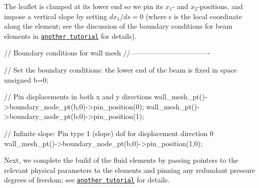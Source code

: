 The leaflet is clamped at its lower end so we pin its $x_1$-\/ and $x_2$-\/positions, and impose a vertical slope by setting $ dx_1/ds = 0 $ (where s is the local coordinate along the element; see the discussion of the boundary conditions for beam elements in \href{../../../beam/tensioned_string/html/index.html}{\tt another tutorial} for details).


\begin{DoxyCodeInclude}


 
 \textcolor{comment}{// Boundary conditions for wall mesh}
 \textcolor{comment}{//----------------------------------}

 \textcolor{comment}{// Set the boundary conditions: the lower end of the beam is fixed in space}
 \textcolor{keywordtype}{unsigned} b=0; 

 \textcolor{comment}{// Pin displacements in both x and y directions}
 wall\_mesh\_pt()->boundary\_node\_pt(b,0)->pin\_position(0); 
 wall\_mesh\_pt()->boundary\_node\_pt(b,0)->pin\_position(1);
 
 \textcolor{comment}{// Infinite slope: Pin type 1 (slope) dof for displacement direction 0 }
 wall\_mesh\_pt()->boundary\_node\_pt(b,0)->pin\_position(1,0);

\end{DoxyCodeInclude}


Next, we complete the build of the fluid elements by passing pointers to the relevant physical parameters to the elements and pinning any redundant pressure degrees of freedom; see \href{../../../navier_stokes/adaptive_driven_cavity/html/index.html}{\tt another tutorial} for details.


